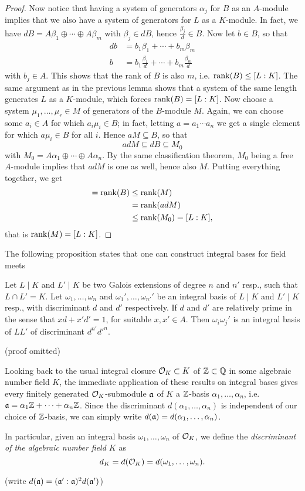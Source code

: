 \begin{proof}
	Now notice that having a system of generators $\alpha_j$ for $B$ as an $A$-module implies that we also have a system of generators for $L$ as a $K$-module. In fact, we have $dB=A\beta_1\oplus\cdots\oplus A\beta_m$ with $\beta_j\in dB$, hence $\frac{\beta_j}{d}\in B$. Now let $b\in B$, so that
	\begin{align*}
		db &= b_1\beta_1 + \cdots + b_m\beta_m\\
		b &= b_1\frac{\beta_1}{d} + \cdots + b_m\frac{\beta_m}{d}
	\end{align*}
	with $b_j\in A$. This shows that the rank of $B$ is also $m$, i.e. $\operatorname{rank}(B)\leq[L:K]$. The same argument as in the previous lemma shows that a system of the same length generates $L$ as a $K$-module, which forces $\operatorname{rank}(B)=[L:K]$. Now choose a system $\mu_1,\dots,\mu_r\in M$ of generators of the $B$-module $M$. Again, we can choose some $a_i\in A$ for which $a_i\mu_i\in B$; in fact, letting $a=a_1\cdots a_n$ we get a single element for which $a\mu_i\in B$ for all $i$. Hence $aM\subseteq B$, so that
	\[
		adM \subseteq dB \subseteq M_0
	\]
	with $M_0=A\alpha_1\oplus\cdots\oplus A\alpha_n$. By the same classification theorem, $M_0$ being a free $A$-module implies that $adM$ is one as well, hence also $M$. Putting everything together, we get
	\begin{align*}
		[L:K] = \rank(B) &\leq \rank(M)\\
			&= \rank(adM)\\
			&\leq \rank(M_0) = [L:K],
	\end{align*}
	that is $\operatorname{rank}(M)=[L:K]$.
\end{proof}

The following proposition states that one can construct integral bases for field meets 

\begin{proposition}
	Let $L\mid K$ and $L'\mid K$ be two Galois extensions of degree $n$ and $n'$ resp., such that $L\cap L'=K$. Let $\omega_1,\dots,\omega_n$ and $\omega_1',\dots,\omega_{n'}'$ be an integral basis of $L\mid K$ and $L'\mid K$ resp., with discriminant $d$ and $d'$ respectively. If $d$ and $d'$ are relatively prime in the sense that $xd+x'd'=1$, for suitable $x,x'\in A$. Then $\omega_i\omega_j'$ is an integral basis of $LL'$ of discriminant $d^{n'}d'^{n}$.
\end{proposition}
(proof omitted)

Looking back to the usual integral closure $\mathcal{O}_K\subset K$ of $\mathbb{Z}\subset\mathbb{Q}$ in some algebraic number field $K$, the immediate application of these results on integral bases gives every finitely generated $\mathcal{O}_K$-submodule $\mathfrak{a}$ of $K$ a $\mathbb{Z}$-basis $\alpha_1,\dots,\alpha_n$, i.e. $\mathfrak{a} = \alpha_1\mathbb{Z}+\cdots+\alpha_n\mathbb{Z}$. Since the discriminant $d(\alpha_1,\dots,\alpha_n)$ is independent of our choice of $\mathbb{Z}$-basis, we can simply write $d(\mathfrak{a})=d(\alpha_1,\dots,\alpha_n)$.

In particular, given an integral basis $\omega_1,\dots,\omega_n$ of $\mathcal{O}_K$, we define the \emph{discriminant of the algebraic number field $K$} as
\[
	d_K = d(\mathcal{O}_K) = d(\omega_1,\dots,\omega_n).
\]

(write $d(\mathfrak{a})=(\mathfrak{a}':\mathfrak{a})^2d(\mathfrak{a}')$)
